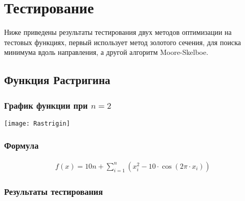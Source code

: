 \documentclass{article}
\begin{document}
    \section{Тестирование}
    Ниже приведены результаты тестирования двух методов оптимизации на тестовых функциях, первый использует метод золотого сечения, для поиска минимума вдоль направления, а другой алгоритм Moore-Skelboe.

    \subsection{Функция Растригина}

    \subsubsection{График функции при $n=2$}
    \texttt{[image: Rastrigin]}

    \subsubsection{Формула}
    \begin{gather*}
        f(x)=10 n+\sum_{i=1}^n\left(x_i^2-10 \cdot \cos \left(2 \pi \cdot x_i\right)\right)
    \end{gather*}

    \subsubsection{Результаты тестирования}
\end{document}
